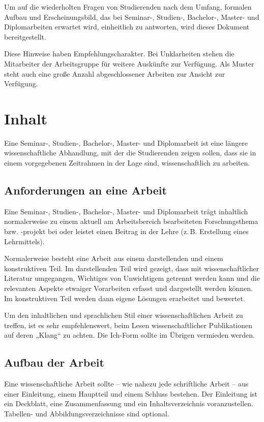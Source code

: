 \documentclass[
    fontsize=12pt,
    headings=small,
    parskip=half,           %
    bibliography=totoc,
    numbers=noenddot,       %
    open=any,               %
    ]{scrreprt}
\begin{document}
Um auf die wiederholten Fragen von Studierenden nach dem Umfang, formalen Aufbau und Erscheinungsbild, das bei Seminar-, Studien-, Bachelor-, Master- und Diplomarbeiten erwartet wird, einheitlich zu antworten, wird dieses Dokument bereitgestellt.

Diese Hinweise haben Empfehlungscharakter. Bei Unklarheiten stehen die Mitarbeiter der Arbeitsgruppe für weitere Auskünfte zur Verfügung. Als Muster steht auch eine große Anzahl abgeschlossener Arbeiten zur Ansicht zur Verfügung.

\chapter{Inhalt}

Eine Seminar-, Studien-, Bachelor-, Master- und Diplomarbeit ist eine längere wissenschaftliche Abhandlung, mit der die Studierenden zeigen sollen, dass sie in einem vorgegebenen Zeitrahmen in der Lage sind, wissenschaftlich zu arbeiten.

\section{Anforderungen an eine Arbeit}

Eine Seminar-, Studien-, Bachelor-, Master- und Diplomarbeit trägt inhaltlich normalerweise zu einem aktuell am Arbeitsbereich bearbeiteten Forschungsthema bzw. -projekt bei oder leistet einen Beitrag in der Lehre (z.\,B. Erstellung eines Lehrmittels).

Normalerweise besteht eine Arbeit aus einem darstellenden und einem konstruktiven Teil. Im darstellenden Teil wird gezeigt, dass mit wissenschaftlicher Literatur umgegangen, Wichtiges von Unwichtigem getrennt werden kann und die relevanten Aspekte etwaiger Vorarbeiten erfasst und dargestellt werden können. Im konstruktiven Teil werden dann eigene Lösungen erarbeitet und bewertet.

Um den inhaltlichen und sprachlichen Stil einer wissenschaftlichen Arbeit zu treffen, ist es sehr empfehlenswert, beim Lesen wissenschaftlicher Publikationen auf deren „Klang“ \cite{Tolk2003} zu achten. Die Ich-Form sollte im Übrigen vermieden werden.

\section{Aufbau der Arbeit}

Eine wissenschaftliche Arbeit sollte -- wie nahezu jede schriftliche Arbeit -- aus einer Einleitung, einem Hauptteil und einem Schluss bestehen. Der Einleitung ist ein Deckblatt, eine Zusammenfassung und ein Inhaltsverzeichnis voranzustellen. Tabellen- und Abbildungsverzeichnisse sind optional.
\end{document}
